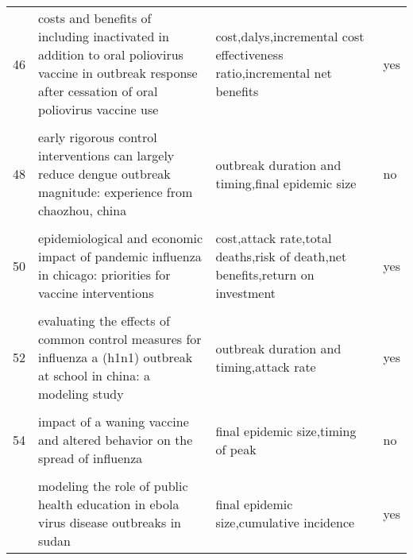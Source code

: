 \documentclass[
]{article}
\begin{document}
\begin{landscape}
\begin{longtable}{l>{\raggedright\arraybackslash}p{4cm}>{\raggedright\arraybackslash}p{6cm}l}
46 & costs and benefits of including inactivated in addition to oral poliovirus vaccine in outbreak response after cessation of oral poliovirus vaccine use & cost,dalys,incremental cost effectiveness ratio,incremental net benefits & yes\\
\cellcolor{gray!6}{47} & \cellcolor{gray!6}{deriving effective vaccine allocation strategies for pandemic influenza: comparison of an agent-based simulation and a compartmental model} & \cellcolor{gray!6}{final epidemic size,cost,total deaths,years of life lost} & \cellcolor{gray!6}{yes}\\
48 & early rigorous control interventions can largely reduce dengue outbreak magnitude: experience from chaozhou, china & outbreak duration and timing,final epidemic size & no\\
\cellcolor{gray!6}{49} & \cellcolor{gray!6}{effects of reactive social distancing on the 1918 influenza pandemic} & \cellcolor{gray!6}{final epidemic size} & \cellcolor{gray!6}{no}\\
50 & epidemiological and economic impact of pandemic influenza in chicago: priorities for vaccine interventions & cost,attack rate,total deaths,risk of death,net benefits,return on investment & yes\\
\addlinespace
\cellcolor{gray!6}{51} & \cellcolor{gray!6}{estimating direct and indirect protective effect of influenza vaccination in the united states} & \cellcolor{gray!6}{cases averted} & \cellcolor{gray!6}{no}\\
52 & evaluating the effects of common control measures for influenza a (h1n1) outbreak at school in china: a modeling study & outbreak duration and timing,attack rate & yes\\
\cellcolor{gray!6}{53} & \cellcolor{gray!6}{evaluation of strategies to control a potential outbreak of foot-and-mouth disease in sweden} & \cellcolor{gray!6}{outbreak duration and timing,final epidemic size,total number of herds surveilled,total number of herds culled,total number of herds vaccinated} & \cellcolor{gray!6}{yes}\\
54 & impact of a waning vaccine and altered behavior on the spread of influenza & final epidemic size,timing of peak & no\\
\cellcolor{gray!6}{55} & \cellcolor{gray!6}{mathematical models for devising the optimal ebola virus disease eradication} & \cellcolor{gray!6}{infection rate} & \cellcolor{gray!6}{no}\\
\addlinespace
56 & modeling the role of public health education in ebola virus disease outbreaks in sudan & final epidemic size,cumulative incidence & yes\\

\end{longtable}
\end{landscape}
\end{document}
